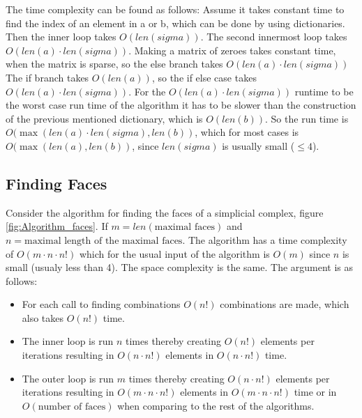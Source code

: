 \documentclass[11pt,a4paper,twoside]{report}
\begin{document}
The time complexity can be found as follows:
Assume it takes constant time to find the index of an element in a or b, which can be done by using dictionaries. Then the inner loop takes $O(len(sigma))$.
The second innermost loop takes $O(len(a)\cdot len(sigma))$.
Making a matrix of zeroes takes constant time, when the matrix is sparse, so the else branch takes $O(len(a)\cdot len(sigma))$
The if branch takes $O(len(a))$, so the if else case takes $O(len(a)\cdot len(sigma))$. 
For the $O(len(a)\cdot len(sigma))$ runtime to be the worst case run time of the algorithm it has to be slower than the construction of the previous mentioned dictionary, which is $O(len(b))$.
So the run time is $O(\max(len(a)\cdot len(sigma),len(b))$, which for most cases is $O(\max(len(a),len(b))$, since $len(sigma)$ is usually small ($\leq 4$).
 

\subsection{Finding Faces}
Consider the algorithm for finding the faces of a simplicial complex, figure \ref{fig:Algorithm_faces}. If $m = len(\text{maximal faces})$ and $n = \text{maximal length of the maximal faces}$. The algorithm has a time complexity of $O(m\cdot n\cdot n!)$ which for the usual input of the algorithm is $O(m)$ since $n$ is small (usualy less than 4). The space complexity is the same. The argument is as follows:
\begin{itemize}
\item For each call to finding combinations $O(n!)$ combinations are made, which also takes $O(n!)$ time.
\item The inner loop is run $n$ times thereby creating $O(n!)$ elements per iterations resulting in $O(n\cdot n!)$ elements in $O(n\cdot n!)$ time.
\item The outer loop is run $m$ times thereby creating $O(n\cdot n!)$ elements per iterations resulting in $O(m\cdot n\cdot n!)$ elements in $O(m\cdot n\cdot n!)$ time or in $O(\text{number of faces})$ when comparing to the rest of the algorithms.
\end{itemize}
\end{document}
